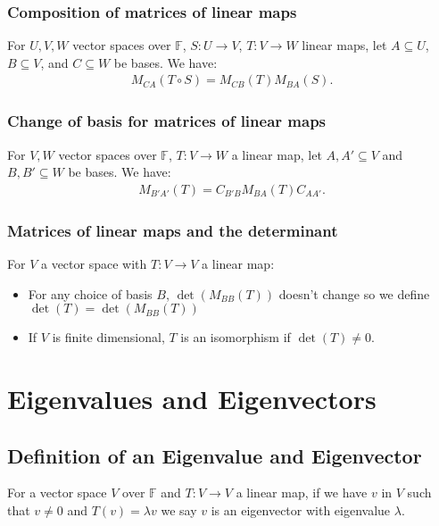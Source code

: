 \documentclass[a4paper, 12pt, twoside]{article}
\begin{document}
\newpage

\subsubsection{Composition of matrices of linear maps}

For $U, V, W$ vector spaces over $\mathbb{F}$, $S : U \to V$, 
$T : V \to W$ linear maps, let $A \subseteq U$, $B \subseteq V$,
and $C \subseteq W$ be bases. We have:
\begin{align*}
  M_{CA}(T \circ S) = M_{CB}(T)M_{BA}(S).
\end{align*}

\subsubsection{Change of basis for matrices of linear maps}

For $V, W$ vector spaces over $\mathbb{F}$, $T : V \to W$ a linear 
map, let $A, A' \subseteq V$ and $B, B' \subseteq W$ be bases. 
We have:
\begin{align*}
  M_{B'A'}(T) = C_{B'B}M_{BA}(T)C_{AA'}.
\end{align*}

\subsubsection{Matrices of linear maps and the determinant}

For $V$ a vector space with $T : V \to V$ a linear map:
\begin{itemize}
  \item For any choice of basis $B$, $\det(M_{BB}(T))$ doesn't change
  so we define $\det(T) = \det(M_{BB}(T))$
  \item If $V$ is finite dimensional, $T$ is an isomorphism if
  $\det(T) \neq 0$.
\end{itemize}

\section{Eigenvalues and Eigenvectors}

\subsection{Definition of an Eigenvalue and Eigenvector}

For a vector space $V$ over $\mathbb{F}$ and $T : V \to V$ a linear
map, if we have $v$ in $V$ such that $v \neq 0$ and $T(v) = \lambda v$
we say $v$ is an eigenvector with eigenvalue $\lambda$.
\end{document}
